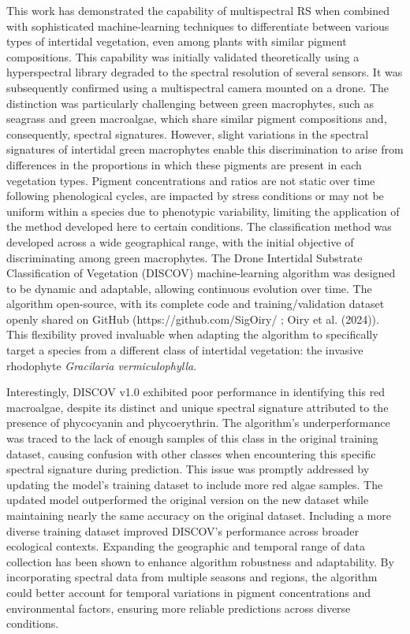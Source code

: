 \documentclass[
  letterpaper,
  11pt,
  english,
  singlespacing,
  headsepline]{MastersDoctoralThesis}
\begin{document}
\begin{spacing}{1.5}
This work has demonstrated the capability of multispectral RS when
combined with sophisticated machine-learning techniques to differentiate
between various types of intertidal vegetation, even among plants with
similar pigment compositions. This capability was initially validated
theoretically using a hyperspectral library degraded to the spectral
resolution of several sensors. It was subsequently confirmed using a
multispectral camera mounted on a drone. The distinction was
particularly challenging between green macrophytes, such as seagrass and
green macroalgae, which share similar pigment compositions and,
consequently, spectral signatures. However, slight variations in the
spectral signatures of intertidal green macrophytes enable this
discrimination to arise from differences in the proportions in which
these pigments are present in each vegetation types. Pigment
concentrations and ratios are not static over time following
phenological cycles, are impacted by stress conditions or may not be
uniform within a species due to phenotypic variability, limiting the
application of the method developed here to certain conditions. The
classification method was developed across a wide geographical range,
with the initial objective of discriminating among green macrophytes.
The Drone Intertidal Substrate Classification of Vegetation (DISCOV)
machine-learning algorithm was designed to be dynamic and adaptable,
allowing continuous evolution over time. The algorithm open-source, with
its complete code and training/validation dataset openly shared on
GitHub (https://github.com/SigOiry/ ; Oiry et al. (2024)). This
flexibility proved invaluable when adapting the algorithm to
specifically target a species from a different class of intertidal
vegetation: the invasive rhodophyte \emph{Gracilaria vermiculophylla}.

Interestingly, DISCOV v1.0 exhibited poor performance in identifying
this red macroalgae, despite its distinct and unique spectral signature
attributed to the presence of phycocyanin and phycoerythrin. The
algorithm's underperformance was traced to the lack of enough samples of
this class in the original training dataset, causing confusion with
other classes when encountering this specific spectral signature during
prediction. This issue was promptly addressed by updating the model's
training dataset to include more red algae samples. The updated model
outperformed the original version on the new dataset while maintaining
nearly the same accuracy on the original dataset. Including a more
diverse training dataset improved DISCOV's performance across broader
ecological contexts. Expanding the geographic and temporal range of data
collection has been shown to enhance algorithm robustness and
adaptability. By incorporating spectral data from multiple seasons and
regions, the algorithm could better account for temporal variations in
pigment concentrations and environmental factors, ensuring more reliable
predictions across diverse conditions.


\end{spacing}
\end{document}
